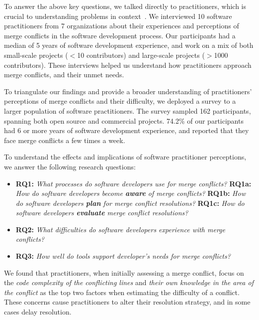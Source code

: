 To answer the above key questions, we talked directly to practitioners, which is crucial to understanding problems in context~\cite{fritz2010using, sillito2006questions, de2008answering, ko2007information}.
We interviewed 10 software practitioners from 7 organizations about their experiences and perceptions of merge conflicts in the software development process.
Our participants had a median of 5 years of software development experience, and work on a mix of both small-scale projects ($<$10 contributors) and large-scale projects ($>$1000 contributors).
These interviews helped us understand how practitioners approach merge conflicts, and their unmet needs.

To triangulate our findings and provide a broader understanding of practitioners' perceptions of merge conflicts and their difficulty, we deployed a survey to a larger population of software practitioners.
The survey sampled 162 participants, spanning both open source and commercial projects. 74.2\% of our participants had 6 or more years of software development experience, and reported that they face merge conflicts a few times a week.

To understand the effects and implications of software practitioner perceptions, we answer the following research questions:

\begin{itemize}
\item \textbf{RQ1:} \textit{What processes do software developers use for merge conflicts?}
\subitem \textbf{RQ1a:} \textit{How do software developers become \textbf{aware} of merge conflicts?}
\subitem \textbf{RQ1b:} \textit{How do software developers \textbf{plan} for merge conflict resolutions?}
\subitem \textbf{RQ1c:} \textit{How do software developers \textbf{evaluate} merge conflict resolutions?}
\item \textbf{RQ2:} \textit{What difficulties do software developers experience with merge conflicts?}
\item \textbf{RQ3:} \textit{How well do tools support developer's needs for merge conflicts?}
\end{itemize}

We found that practitioners, when initially assessing a merge conflict, focus on the \textit{code complexity of the conflicting lines} and \textit{their own knowledge in the area of the conflict} as the top two factors when estimating the difficulty of a conflict. These concerns cause practitioners to alter their resolution strategy, and in some cases delay resolution.

